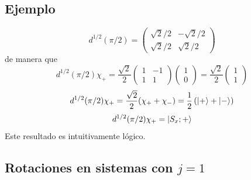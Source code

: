 \documentclass[10pt,oneside]{CBFT_book}
\begin{document}
\subsection{Ejemplo}

\[
	d^{1/2}(\pi/2) = \begin{pmatrix}
	                  \sqrt{2}/2 & -\sqrt{2}/2 \\
	                  \sqrt{2}/2 & \sqrt{2}/2
	                 \end{pmatrix}
\]
de manera que 
\[
	d^{1/2}(\pi/2)\chi_{+} = \frac{\sqrt{2}}{2}\begin{pmatrix} 1 & -1 \\  1 & 1 \end{pmatrix}
	                                           \begin{pmatrix}  1 \\ 0  \end{pmatrix} 
				= \frac{\sqrt{2}}{2} \begin{pmatrix}  1 \\ 1 \end{pmatrix} 
\]
\[
	d^{1/2}(\pi/2)\chi_{+} = \frac{\sqrt{2}}{2} (\chi_+ + \chi_- )  = \frac{1}{2} \left( \Ket{+} + \Ket{-} \right)
\]
\[
	d^{1/2}(\pi/2)\chi_{+} = \Ket{S_x ; + }
\]
Este resultado es intuitivamente lógico.


\subsection{Rotaciones en sistemas con $j=1$}
\end{document}

